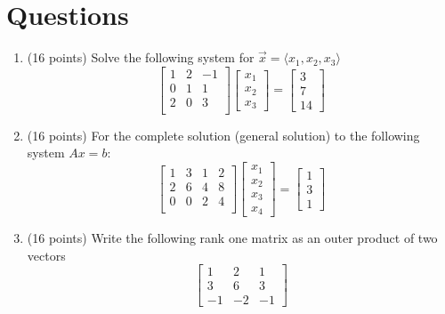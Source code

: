 \documentclass[12pt, a4paper]{article}
\theoremstyle{break}
\begin{document}
\section{Questions}
\begin{enumerate}
\item (16  points) Solve the following system for $\vec{x}=\langle x_1,x_2,x_3 \rangle$
\begin{equation}
\begin{bmatrix}
1&2&-1 \\
0&1&1 \\
2&0&3 \\
\end{bmatrix}
\begin{bmatrix}
x_1\\
x_2 \\
x_3 
\end{bmatrix}=
\begin{bmatrix}
3\\
7\\
14 
\end{bmatrix} \nonumber
\end{equation} 
\newpage
\item (16 points)  For the complete solution (general solution) to the following system $Ax=b$:
\begin{equation}
\begin{bmatrix}
1 & 3 & 1 &2  \\
2&6 &4 & 8 \\
0&0&2&4 \\
\end{bmatrix}
\begin{bmatrix}
x_1\\
x_2 \\
x_3 \\
x_4 
\end{bmatrix}=
\begin{bmatrix}
1 \\
3 \\
1 
\end{bmatrix} \nonumber
\end{equation}
\newpage

\item (16 points) Write the following rank one matrix as an outer product of two vectors
\begin{equation}
\begin{bmatrix}
1 & 2 & 1 \\
3&6&3 \\
-1&-2&-1
\end{bmatrix} \nonumber
\end{equation}
\newpage


\end{enumerate}
\end{document}

